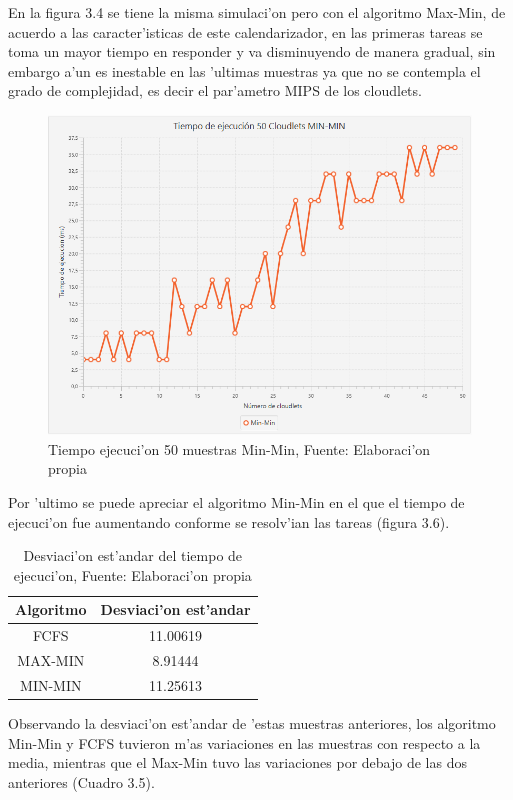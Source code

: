  En la figura 3.4 se tiene la misma simulaci'on pero con el algoritmo Max-Min, de acuerdo a las caracter'isticas de este calendarizador, en las primeras tareas se toma un mayor tiempo en responder y va disminuyendo de manera gradual, sin embargo a'un es inestable en las 'ultimas muestras ya que no se contempla el grado de complejidad, es decir el par'ametro MIPS de los cloudlets.

\begin{figure}[H] 
	\caption{Tiempo ejecuci'on 50 muestras Min-Min, Fuente: Elaboraci'on propia}
	\centering
	\includegraphics[scale=0.5]{media/min-min}
\end{figure}


Por 'ultimo se puede apreciar el algoritmo Min-Min en el que el tiempo de ejecuci'on fue aumentando conforme se resolv'ian las tareas (figura 3.6).

\begin{table}[!hbt]
	\centering
	\caption{Desviaci'on est'andar del tiempo de ejecuci'on, Fuente: Elaboraci'on propia}
	\label{my-label}
	\begin{tabular}{@{}cc@{}}
		\toprule
		{\bf Algoritmo} & \multicolumn{1}{l}{{\bf Desviaci'on est'andar}} \\ \midrule
		FCFS & 11.00619 \\
		MAX-MIN & 8.91444 \\
		MIN-MIN & 11.25613 \\ \bottomrule
	\end{tabular}
\end{table}

Observando la desviaci'on est'andar de 'estas muestras anteriores, los algoritmo Min-Min y FCFS tuvieron m'as variaciones en las muestras con respecto a la media, mientras que el Max-Min tuvo las variaciones por debajo de las dos anteriores (Cuadro 3.5).